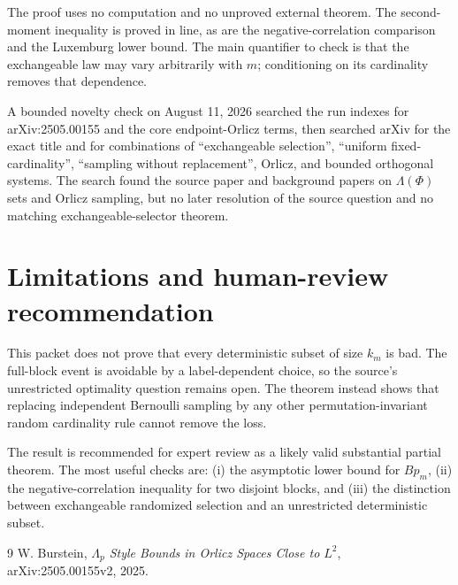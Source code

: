\documentclass[11pt]{article}
\begin{document}
The proof uses no computation and no unproved external theorem.  The
second-moment inequality is proved in line, as are the negative-correlation
comparison and the Luxemburg lower bound.  The main quantifier to check is
that the exchangeable law may vary arbitrarily with $m$; conditioning on its
cardinality removes that dependence.

A bounded novelty check on August 11, 2026 searched the run indexes for
arXiv:2505.00155 and the core endpoint-Orlicz terms, then searched arXiv for
the exact title and for combinations of ``exchangeable selection'', ``uniform
fixed-cardinality'', ``sampling without replacement'', Orlicz, and bounded
orthogonal systems.  The search found the source paper and background papers
on $\Lambda(\Phi)$ sets and Orlicz sampling, but no later resolution of the
source question and no matching exchangeable-selector theorem.

\section{Limitations and human-review recommendation}

This packet does not prove that every deterministic subset of size $k_m$ is
bad.  The full-block event is avoidable by a label-dependent choice, so the
source's unrestricted optimality question remains open.  The theorem instead
shows that replacing independent Bernoulli sampling by any other
permutation-invariant random cardinality rule cannot remove the loss.

The result is recommended for expert review as a likely valid substantial
partial theorem.  The most useful checks are: (i) the asymptotic lower bound
for $Bp_m$, (ii) the negative-correlation inequality for two disjoint blocks,
and (iii) the distinction between exchangeable randomized selection and an
unrestricted deterministic subset.

\begin{thebibliography}{9}
W. Burstein,
\emph{$\Lambda_p$ Style Bounds in Orlicz Spaces Close to $L^2$},
arXiv:2505.00155v2, 2025.
\end{thebibliography}
\end{document}

